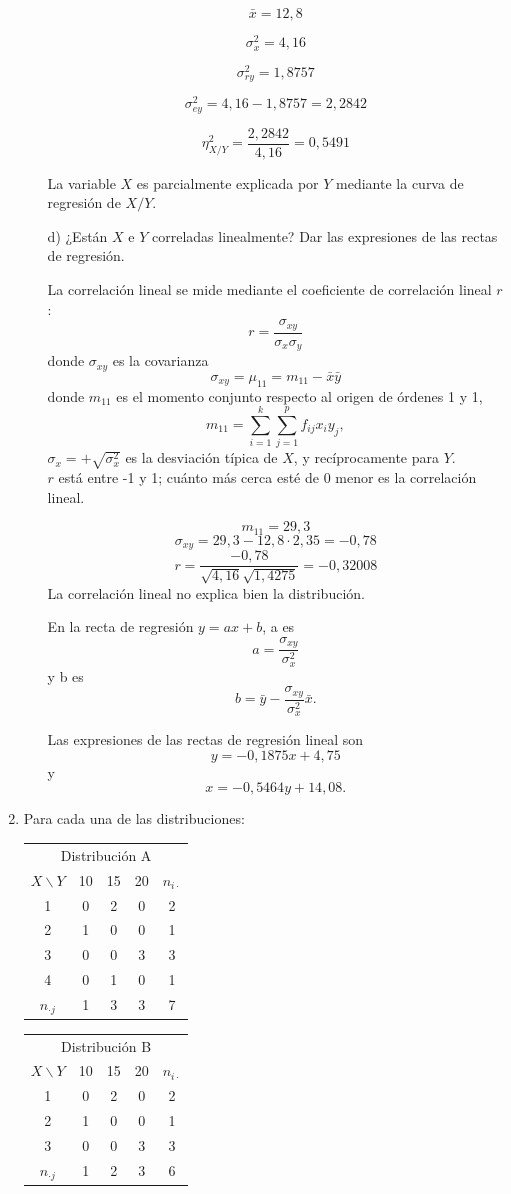\documentclass[10pt,a4paper]{article}
\begin{document}
\begin{enumerate}
\begin{itemize}
$$\bar x = 12,8$$

$$\sigma^2_x = 4,16$$

$$\sigma^2_{ry} = 1,8757$$

$$\sigma^2_{ey} = 4,16 - 1,8757 = 2,2842$$

$$\eta^2_{X/Y} = \frac{2,2842}{4,16} = 0,5491$$

La variable $X$ es parcialmente explicada por $Y$ mediante la curva de regresión de $X/Y$.

\item[d)]¿Están $X$ e $Y$ correladas linealmente? Dar las expresiones de las rectas de regresión.

La correlación lineal se mide mediante el coeficiente de correlación lineal $r$:
$$r = \frac{\sigma_{xy}}{\sigma_x \sigma_y}$$
donde $\sigma_{xy}$ es la covarianza
$$\sigma_{xy} = \mu_{11} = m_{11} - \bar x \bar y$$
donde $m_{11}$ es el momento conjunto respecto al origen de órdenes 1 y 1,
$$m_{11} = \sum_{i=1}^k \sum_{j=1}^p f_{ij} x_i y_j,$$
$\sigma_x = +\sqrt{\sigma_x^2}$ es la desviación típica de $X$, y recíprocamente para $Y$.
\\$r$ está entre -1 y 1; cuánto más cerca esté de 0 menor es la correlación lineal.

$$m_{11} = 29,3$$
$$\sigma_{xy} = 29,3 - 12,8\cdot2,35 = -0,78$$
$$r = \frac{-0,78}{\sqrt{4,16}\sqrt{1,4275}} = -0,32008$$
La correlación lineal no explica bien la distribución.

En la recta de regresión $y = ax + b$, a es
$$a = \frac{\sigma_{xy}}{\sigma_x^2}$$
y b es
$$b = \bar y - \frac{\sigma_{xy}}{\sigma_x^2} \bar x.$$

Las expresiones de las rectas de regresión lineal son
$$y = -0,1875x + 4,75$$
y
$$x = -0,5464y + 14,08.$$

\end{itemize}

\newpage

\item Para cada una de las distribuciones:

\begin{center}
\begin{tabular}{c|ccc|c}
\multicolumn{5}{c}{Distribución A}\\
$X \backslash Y$ & 10 & 15 & 20 & $n_{i\cdot}$\\\hline
1 & 0 & 2 & 0 & 2 \\
2 & 1 & 0 & 0 & 1 \\
3 & 0 & 0 & 3 & 3 \\
4 & 0 & 1 & 0 & 1\\\hline
$n_{\cdot j}$ & 1 & 3 & 3 & 7\\
\end{tabular}
\begin{tabular}{c|ccc|c}
\multicolumn{5}{c}{Distribución B}\\
$X \backslash Y$ & 10 & 15 & 20 & $n_{i\cdot}$\\\hline
1 & 0 & 2 & 0 & 2 \\
2 & 1 & 0 & 0 & 1 \\
3 & 0 & 0 & 3 & 3 \\\hline
$n_{\cdot j}$ & 1 & 2 & 3 & 6\\


\end{tabular}
\end{center}
\end{enumerate}
\end{document}
